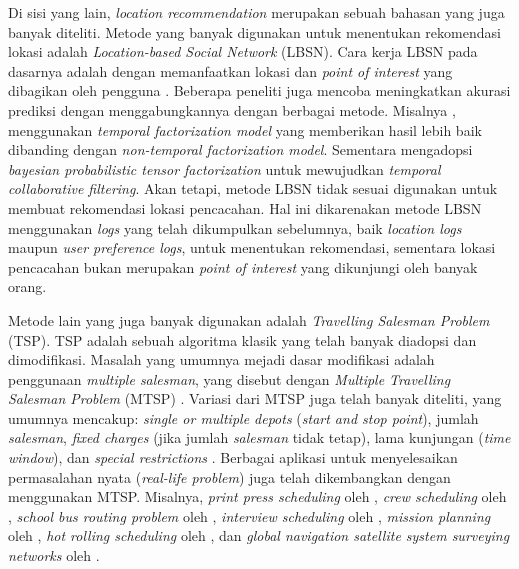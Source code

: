 Di sisi yang lain, \textit{location recommendation} merupakan sebuah bahasan yang juga banyak diteliti. Metode yang banyak digunakan untuk menentukan rekomendasi lokasi adalah \textit{Location-based Social Network} (LBSN). Cara kerja LBSN pada dasarnya adalah dengan memanfaatkan lokasi dan \textit{point of interest} yang dibagikan oleh pengguna \citep{yuan_location_2016}. Beberapa peneliti juga mencoba meningkatkan akurasi prediksi dengan menggabungkannya dengan berbagai metode. Misalnya \citep{koren_collaborative_2010}, menggunakan \textit{temporal factorization model} yang memberikan hasil lebih baik dibanding dengan \textit{non-temporal factorization model}. Sementara  \citep{pragarauskas_temporal_2010} mengadopsi \textit{bayesian probabilistic tensor factorization} untuk mewujudkan \textit{temporal collaborative filtering}. Akan tetapi, metode LBSN tidak sesuai digunakan untuk membuat rekomendasi lokasi pencacahan. Hal ini dikarenakan metode LBSN menggunakan \textit{logs} yang telah dikumpulkan sebelumnya, baik \textit{location logs} maupun \textit{user preference logs}, untuk menentukan rekomendasi, sementara lokasi pencacahan bukan merupakan \textit{point of interest} yang dikunjungi oleh banyak orang.


Metode lain yang juga banyak digunakan adalah \textit{Travelling Salesman Problem} (TSP). TSP adalah sebuah algoritma klasik \citep{biggs_graph_1976} yang telah banyak diadopsi dan dimodifikasi. Masalah yang umumnya mejadi dasar modifikasi adalah penggunaan \textit{multiple salesman}, yang disebut dengan \textit{Multiple Travelling Salesman Problem} (MTSP) \citep{bektas_multiple_2006}. Variasi dari MTSP juga telah banyak diteliti, yang umumnya mencakup: \textit{single or multiple depots} (\textit{start and stop point}), jumlah \textit{salesman}, \textit{fixed charges} (jika jumlah \textit{salesman} tidak tetap), lama kunjungan (\textit{time window}), dan \textit{special restrictions} \citep{bektas_multiple_2006}. Berbagai aplikasi untuk menyelesaikan permasalahan nyata (\textit{real-life problem}) juga telah dikembangkan dengan menggunakan MTSP. Misalnya, \textit{print press scheduling} oleh \citep{gorenstein_printing_1970}, \textit{crew scheduling} oleh \citep{svestka_computational_1973}, \textit{school bus routing problem} oleh \citep{angel_computer-assisted_1972}, \textit{interview scheduling} oleh \citep{gilbert_new_1992}, \textit{mission planning} oleh \citep{brumitt_dynamic_1996}, \textit{hot rolling scheduling} oleh \citep{tang_multiple_2000}, dan \textit{global navigation satellite system surveying networks} oleh \citep{saleh_design_2004}.


